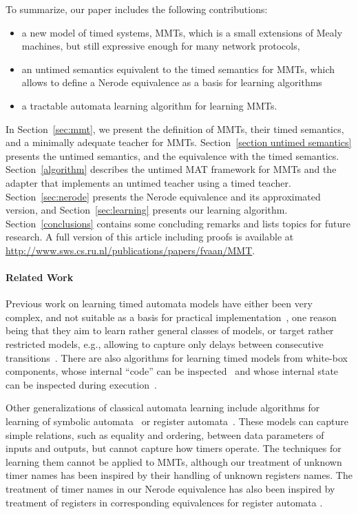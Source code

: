 To summarize, our paper includes the following contributions:
\begin{itemize}
\item
  a new model of timed systems, MMTs, which is a small extensions of Mealy machines, but still expressive enough for many network protocols,
  \item
    an untimed semantics equivalent to the timed semantics for MMTs, which allows
    to define a Nerode equivalence as a basis for learning algorithms
   \item
     a tractable automata learning algorithm for learning MMTs.
\end{itemize}

In Section~\ref{sec:mmt}, we present the definition of MMTs, their timed semantics, and a minimally adequate teacher for MMTs.
Section~\ref{section untimed semantics} presents the untimed semantics, and the
equivalence with the timed semantics.
Section~\ref{algorithm} describes the untimed MAT framework for MMTs and the adapter that implements an untimed teacher using a timed teacher.
Section~\ref{sec:nerode} presents the Nerode equivalence and its approximated
version, and
Section~\ref{sec:learning} presents our learning algorithm.
Section~\ref{conclusions} contains some concluding remarks and lists topics for future research.
\ifshort
A full version of this article including proofs is available at \url{http://www.sws.cs.ru.nl/publications/papers/fvaan/MMT}.
\fi

\paragraph{Related Work}
Previous work on learning timed automata models have either been very complex, and not suitable as a basis for
practical implementation~\cite{GrinchteinJP06,GrinchteinJL10}, one reason being that they aim to learn rather
general classes of models, or target rather restricted models, e.g., allowing to capture only
delays between consecutive transitions~\cite{VWW:rti,VWW:ic11}. 
There are also algorithms for learning timed models from white-box components,
whose internal ``code'' can be inspected~\cite{lin2014learning} and whose
internal state can be inspected during execution~\cite{maier2014online}.

Other generalizations of classical automata learning include algorithms for
learning of symbolic automata~\cite{MensM15,Drews:tacas17}
or register automata~\cite{BLP:remember,HoStMe2011,HowarSJC12,CasselHJS16}.
These models
can capture simple relations, such as equality and ordering,
between data parameters of inputs and outputs, but cannot capture how
timers operate. The techniques for learning them cannot be applied to
MMTs, although our treatment of unknown timer names has been inspired by
their handling of unknown registers names.
The treatment of timer names in our Nerode equivalence has also been inspired
by treatment of registers in corresponding equivalences for register automata
\cite{CasselHJMS15}.
